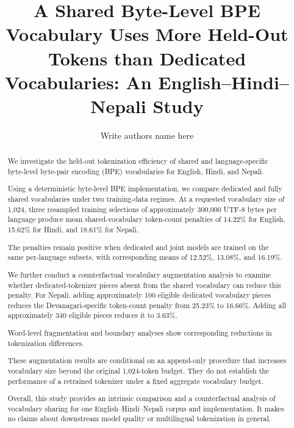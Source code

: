 \documentclass[10pt,twocolumn]{article}
\title{
A Shared Byte-Level BPE Vocabulary Uses More Held-Out
Tokens than Dedicated Vocabularies:
An English--Hindi--Nepali Study
}
\author{
Write authors name here
}
\date{}
\begin{document}
\maketitle


\begin{abstract}

We investigate the held-out tokenization efficiency of shared
and language-specific byte-level byte-pair encoding (BPE)
vocabularies for English, Hindi, and Nepali.

Using a deterministic byte-level BPE implementation, we
compare dedicated and fully shared vocabularies under two
training-data regimes. At a requested vocabulary size of
1,024, three resampled training selections of approximately
300,000 UTF-8 bytes per language produce mean shared-vocabulary
token-count penalties of 14.22\% for English, 15.62\% for
Hindi, and 18.61\% for Nepali.

The penalties remain positive when dedicated and joint models
are trained on the same per-language subsets, with corresponding
means of 12.52\%, 13.08\%, and 16.19\%.

We further conduct a counterfactual vocabulary augmentation
analysis to examine whether dedicated-tokenizer pieces absent
from the shared vocabulary can reduce this penalty. For Nepali,
adding approximately 100 eligible dedicated vocabulary pieces
reduces the Devanagari-specific token-count penalty from 25.23\%
to 16.66\%. Adding all approximately 340 eligible pieces reduces
it to 3.63\%.

Word-level fragmentation and boundary analyses show corresponding
reductions in tokenization differences.

These augmentation results are conditional on an append-only
procedure that increases vocabulary size beyond the original
1,024-token budget. They do not establish the performance of a
retrained tokenizer under a fixed aggregate vocabulary budget.

Overall, this study provides an intrinsic comparison and a
counterfactual analysis of vocabulary sharing for one
English--Hindi--Nepali corpus and implementation. It makes no
claims about downstream model quality or multilingual
tokenization in general.

\end{abstract}

\end{document}
